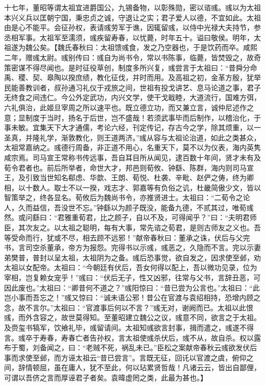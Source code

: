 \documentclass[12pt,UTF8]{ctexbook}
\begin{document}
十七年，董昭等谓太祖宜进爵国公，九锡备物，以彰殊勋，密以谘彧。彧以为太祖本兴义兵以匡朝宁国，秉忠贞之诚，守退让之实；君子爱人以德，不宜如此。太祖由是心不能平。会征孙权，表请彧劳军于谯，因辄留彧，以侍中光禄大夫持节，参丞相军事。太祖军至濡须，彧疾留寿春，以忧薨，时年五十。谥曰敬侯。明年，太祖遂为魏公矣。【魏氏春秋曰：太祖馈彧食，发之乃空器也，于是饮药而卒。咸熙二年，赠彧太尉。彧别传曰：彧自为尚书令，常以书陈事，临薨，皆焚毁之，故奇策密谋不得尽闻也。是时征役草创，制度多所兴复，彧尝言于太祖曰：“昔舜分命禹、稷、契、皋陶以揆庶绩，教化征伐，并时而用。及高祖之初，金革方殷，犹举民能善教训者，叔孙通习礼仪于戎旅之间，世祖有投戈讲艺、息马论道之事，君子无终食之间违仁。今公外定武功，内兴文学，使干戈戢睦，大道流行，国难方弭，六礼俱治，此姬旦宰周之所以速平也。既立德立功，而又兼立言，诚仲尼述作之意；显制度于当时，扬名于后世，岂不盛哉！若须武事毕而后制作，以稽治化，于事未敏。宜集天下大才通儒，考论六经，刊定传记，存古今之学，除其烦重，以一圣真，并隆礼学，渐敦教化，则王道两济。”彧从容与太祖论治道，如此之类甚众，太祖常嘉纳之。彧德行周备，非正道不用心，名重天下，莫不以为仪表，海内英隽咸宗焉。司马宣王常称书传远事，吾自耳目所从闻见，逮百数十年间，贤才未有及荀令君者也。前后所举者，命世大才，邦邑则荀攸、钟繇、陈群，海内则司马宣王，及引致当世知名郗虑、华歆、王朗、荀悦、杜袭、辛毗、赵俨之俦，终为卿相，以十数人。取士不以一揆，戏志才、郭嘉等有负俗之讥，杜畿简傲少文，皆以智策举之，终各显名。荀攸后为魏尚书令，亦推贤进士。太祖曰：“二荀令之论人，久而益信，吾没世不忘。”钟繇以为颜子既没，能备九德，不贰其过，唯荀彧然。或问繇曰：“君雅重荀君，比之颜子，自以不及，可得闻乎？”曰：“夫明君师臣，其次友之。以太祖之聪明，每有大事，常先谘之荀君，是则古师友之义也。吾等受命而行，犹或不尽，相去顾不远邪！”献帝春秋曰：董承之诛，伏后与父完书，言司空杀董承，帝方为报怨。完得书以示彧，彧恶之，久隐而不言。完以示妻弟樊普，普封以呈太祖，太祖阴为之备。彧后恐事觉，欲自发之，因求使至邺，劝太祖以女配帝。太祖曰：“今朝廷有伏后，吾女何得以配上，吾以微功见录，位为宰相，岂复赖女宠乎！”彧曰：“伏后无子，性又凶邪，往常与父书，言辞丑恶，可因此废也。”太祖曰：“卿昔何不道之？”彧阳惊曰：“昔已尝为公言也。”太祖曰：“此岂小事而吾忘之！”彧又惊曰：“诚未语公邪！昔公在官渡与袁绍相持，恐增内顾之念，故不言尔。”太祖曰：“官渡事后何以不言？”彧无对，谢阙而已。太祖以此恨彧，而外含容之，故世莫得知。至董昭建立魏公之议，彧意不同，欲言之于太祖。及赍玺书犒军，饮飨礼毕，彧留请间。太祖知彧欲言封事，揖而遣之，彧遂不得言。彧卒于寿春，寿春亡者告孙权，言太祖使彧杀伏后，彧不从，故自杀。权以露布于蜀，刘备闻之，曰：“老贼不死，祸乱未已。”臣松之案献帝春秋云彧欲发伏后事而求使至邺，而方诬太祖云“昔已尝言”。言既无征，回讬以官渡之虞，俯仰之间，辞情顿屈，虽在庸人，犹不至此，何以玷累贤哲哉！凡诸云云，皆出自鄙俚，可谓以吾侪之言而厚诬君子者矣。袁暐虚罔之类，此最为甚也。】
\end{document}
